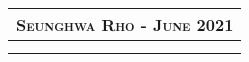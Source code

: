 \documentclass[10pt]{article}
\begin{document}
\begin{center}
\clearpage

\begin{tabular}{llllr}
\multicolumn{5}{r}{\textsc{Seunghwa Rho - June 2021}} \vspace{0.2cm}\\ \hline
\multicolumn{5}{p{500pt}}{}\\\\
\end{tabular}

\begin{tabular}{llllr}

\end{tabular}
\end{center}
\end{document}
